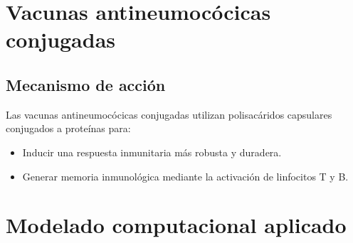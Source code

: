 \section{Vacunas antineumocócicas conjugadas}

\subsection{Mecanismo de acción}
Las vacunas antineumocócicas conjugadas utilizan polisacáridos capsulares conjugados a proteínas para:
\begin{itemize}
    \item Inducir una respuesta inmunitaria más robusta y duradera.
    \item Generar memoria inmunológica mediante la activación de linfocitos T y B.
\end{itemize}



\section{Modelado computacional aplicado}

